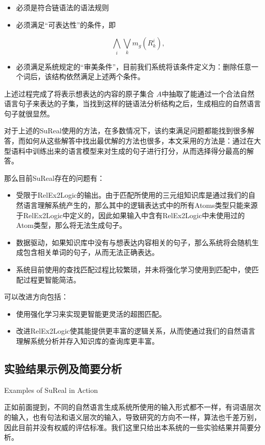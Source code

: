 \begin{itemize}
\item 必须是符合链语法的语法规则
\item 必须满足“可表达性”的条件，即

$$
\bigwedge_i \bigvee_k m_g(R^i_k),
$$

\item 必须满足系统规定的“审美条件”，目前我们系统将该条件定义为：删除任意一个词后，该结构依然满足上述两个条件。
\end{itemize}

\noindent 上述过程完成了将表示想表达的内容的原子集合 $A$中抽取了能通过一个合法自然语言句子来表达的子集，当找到这样的链语法分析结构之后，生成相应的自然语言句子就很显然。

对于上述的SuReal使用的方法，在多数情况下，该约束满足问题都能找到很多解答，而如何从这些解答中找出最优解的方法也很多，本文采用的方法是：通过在大型语料中训练出来的语言模型来对生成的句子进行打分，从而选择得分最高的解答。

那么目前SuReal存在的问题有：

\begin{itemize}
\item 受限于RelEx2Logic的输出。由于匹配所使用的三元组知识库是通过我们的自然语言理解系统产生的，那么其中的逻辑表达式中的所有Atoms类型只能来源于RelEx2Logic中定义的，因此如果输入中含有RelEx2Logic中未使用过的Atom类型，那么将无法生成句子。
\item 数据驱动，如果知识库中没有与想表达内容相关的句子，那么系统将会随机生成包含相关单词的句子，从而无法正确表达。
\item 系统目前使用的查找匹配过程比较繁琐，并未将强化学习使用到匹配中，使匹配过程更智能简洁。
\end{itemize}

可以改进方向包括：

\begin{itemize}
\item 使用强化学习来实现更智能更灵活的超图匹配。
\item 改进RelEx2Logic使其能提供更丰富的逻辑关系，从而使通过我们的自然语言理解系统分析并存入知识库的查询库更丰富。
\end{itemize}


\subsection{实验结果示例及简要分析}{Examples of SuReal in Action}


正如前面提到，不同的自然语言生成系统所使用的输入形式都不一样，有词语层次的输入，也有句法和语义层次的输入，导致研究的方向不一样，算法也千差万别，因此目前并没有权威的评估标准。我们这里只给出本系统的一些实验结果并简要分析。

